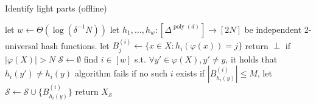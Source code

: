 \documentclass[letterpaper,11pt]{article}
\theoremstyle{plain}
\theoremstyle{definition}
\theoremstyle{remark}
\DeclareMathOperator{\poly}{poly}
\renewcommand{\phi}{\varphi}
\newcommand{\calS}{\mathcal{S}}
\begin{document}
\begin{appendices}
\begin{algorithm}
    \caption{Identify light parts (offline)}
    \label{alg:light parts}
    \begin{algorithmic}[1]
        \State let $w\gets \Theta(\log (\delta^{-1}N))$
        \State let $h_1,\dots,h_w:[\Delta^{\poly(d)}]\to [2N]$ be independent 2-universal hash functions. \label{alg line: hash}
         \label{alg line: for}
            \State let $B^{(i)}_j\gets \{x\in X: h_i(\phi(x))=j\}$ \label{alg line:B^i_j}
        \EndFor \label{alg line: endfor}
        \State return $\perp$ if $|\phi(X)| > N$
        \State $\calS\gets \emptyset$ \label{alg line:remaining begins}
        \For{$y\in \phi(X)$} \label{alg line:phi(X)}
            \State find $i\in[w]$ s.t. $\forall y'\in \phi(X),y'\neq y$, it holds that $h_i(y')\neq h_i(y)$ \label{alg line:find i} 
            \State algorithm fails if no such $i$ exists
            \State if $|B^{(i)}_{h_i(y)}|\le M$, let $\calS\gets \calS\cup \{B^{(i)}_{h_i(y)}\}$ \Comment{$B^{(i)}_{h_i(y)} = \phi^{-1}(y)$} \label{alg line:|B^i_j|<= beta}
        \EndFor
        \State return $X_{\calS}$ \label{alg line:remaining ends}
    \end{algorithmic}
\end{algorithm}


\end{appendices}
\end{document}

